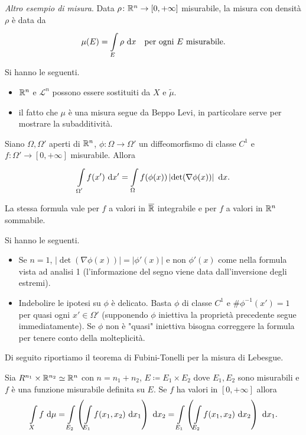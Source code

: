 \documentclass[a4paper, 11pt]{report}
\begin{document}
\textit{Altro esempio di misura}. Data $\rho \colon  \mathbb R^n \to [0,+\infty]$ misurabile, la misura con densità $\rho$ è data da
\[
\mu(E) = \int\limits_{\mathclap{E}}^{} \rho \, \dd x \quad \text{per ogni} \ E \ \text{misurabile}.
\] 
%
\begin{osservazione}
Si hanno le seguenti.
\begin{itemize}[label={}]
	\item $\mathbb R^n$ e $\mathcal{L}^n$ possono essere sostituiti da $X$ e $\widetilde{\mu}$.
	\item il fatto che $\mu$ è una misura segue da Beppo Levi, in particolare serve per mostrare la subadditività.
\end{itemize}
\end{osservazione}
%
\begin{teorema}
Siano $\Omega, \Omega'$ aperti di $\mathbb R^n$, $\phi \colon \Omega \to \Omega' $ un diffeomorfismo di classe $C^1$ e $f \colon \Omega' \to [0,+\infty]$ misurabile. Allora
\[
\int\limits_{\mathclap{\Omega'}}^{} f(x') \, \dd x' = \int\limits_{\mathclap{\Omega}}^{} f(\phi(x)) \left| \det(\nabla \phi(x)) \right| \, \dd x.
\] 
\end{teorema}
%
La stessa formula vale per $f$ a valori in $\overline{\mathbb R}$ integrabile e per $f$ a valori in $\mathbb R^n$ sommabile.
\begin{osservazione}
Si hanno le seguenti.
\begin{itemize}[label={--}]
	\item Se $n = 1$, $\left| \det(\nabla \phi(x)) \right| = \left| \phi'(x) \right|$ e non $\phi'(x)$ come nella formula vista ad analisi 1 (l'informazione del segno viene data dall'inversione degli estremi).
	\item Indebolire le ipotesi su $\phi$ è delicato. Basta $\phi$ di classe $C^1$ e $\# \phi^{-1}(x') = 1$ per quasi ogni $x' \in \Omega'$ (supponendo $\phi$ iniettiva la proprietà precedente segue immediatamente).
	Se $\phi$ non è "quasi" iniettiva bisogna correggere la formula per tenere conto della molteplicità.
\end{itemize}
\end{osservazione}
%
Di seguito riportiamo il teorema di Fubini-Tonelli per la misura di Lebesgue.
%
\begin{teorema}
Sia $R^{n_1} \times \mathbb R^{n_2} \simeq \mathbb R^n$ con $n = n_1 + n_2$, $ E \coloneqq E_1 \times E_2 $ dove $E_1, E_2$ sono misurabili e $f$ è una funzione misurabile definita su $E$.
Se $f$ ha valori in $[0,+\infty]$ allora
\[
	\int\limits_X f \, \dd \mu = \int\limits_{\mathclap{E_2}}^{} \left( \int\limits_{\mathclap{E_1}}^{} f(x_1,x_2) \, \dd x_1  \right) \, \dd x_2 = \int\limits_{\mathclap{E_1}}^{} \left( \int\limits_{\mathclap{E_2}}^{} f(x_1,x_2) \, \dd x_2  \right) \, \dd x_1.
\] 
\end{teorema}
\end{document}
